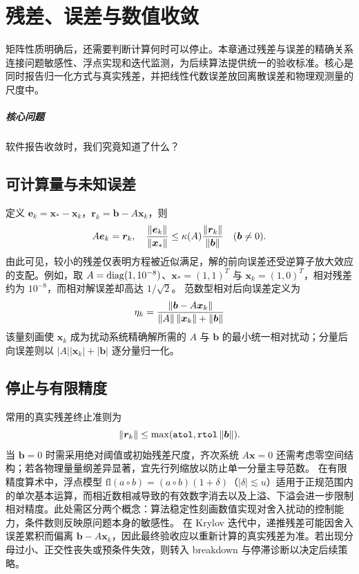\chapter{残差、误差与数值收敛}\label{v0ch:3}
\begin{chaptersummary}
矩阵性质明确后，还需要判断计算何时可以停止。本章通过残差与误差的精确关系连接问题敏感性、浮点实现和迭代监测，为后续算法提供统一的验收标准。核心是同时报告归一化方式与真实残差，并把线性代数误差放回离散误差和物理观测量的尺度中。
\end{chaptersummary}
\paragraph{核心问题}软件报告收敛时，我们究竟知道了什么？

\section{可计算量与未知误差}
定义 $\bm e_k=\bm x_*-\bm x_k$，$\bm r_k=\bm b-A\bm x_k$，则
\[
 A\bm e_k=\bm r_k,\quad
 \frac{\left\lVert \bm e_k\right\rVert}{\left\lVert \bm x_*\right\rVert}
 \le \kappa(A)\frac{\left\lVert \bm r_k\right\rVert}{\left\lVert \bm b\right\rVert}\quad(\bm b\ne0).
\]
由此可见，较小的残差仅表明方程被近似满足，解的前向误差还受逆算子放大效应的支配。例如，取 $A=\operatorname{diag}(1,10^{-8})$、$\bm x_*=(1,1)^T$ 与 $\bm x_k=(1,0)^T$，相对残差约为 $10^{-8}$，而相对解误差却高达 $1/\sqrt2$。
范数型相对后向误差定义为
\[
 \eta_k=\frac{\left\lVert \bm b-A\bm x_k\right\rVert}
 {\left\lVert A\right\rVert\left\lVert \bm x_k\right\rVert+\left\lVert \bm b\right\rVert}
\]
该量刻画使 $\bm x_k$ 成为扰动系统精确解所需的 $A$ 与 $\bm b$ 的最小统一相对扰动；分量后向误差则以 $|A||\bm x_k|+|\bm b|$ 逐分量归一化。
\section{停止与有限精度}
常用的真实残差终止准则为
\[
 \left\lVert \bm r_k\right\rVert\le
 \max(\texttt{atol},\texttt{rtol}\left\lVert \bm b\right\rVert).
\]
当 $\bm b=0$ 时需采用绝对阈值或初始残差尺度，齐次系统 $A\bm x=0$ 还需考虑零空间结构；若各物理量量纲差异显著，宜先行列缩放以防止单一分量主导范数。
在有限精度算术中，浮点模型 $\mathrm{fl}(a\circ b)=(a\circ b)(1+\delta)$（$|\delta|\lesssim u$）适用于正规范围内的单次基本运算，而相近数相减导致的有效数字消去以及上溢、下溢会进一步限制相对精度。此处需区分两个概念：算法稳定性刻画数值实现对舍入扰动的控制能力，条件数则反映原问题本身的敏感性。
在 Krylov 迭代中，递推残差可能因舍入误差累积而偏离 $\bm b-A\bm x_k$，因此最终验收应以重新计算的真实残差为准。若出现分母过小、正交性丧失或预条件失效，则转入 breakdown 与停滞诊断以决定后续策略。
